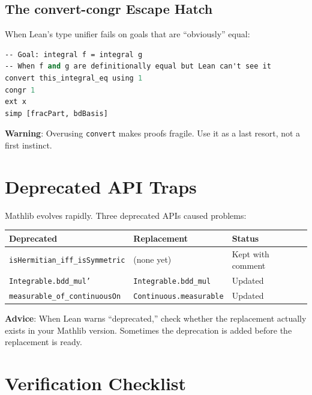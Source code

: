 \documentclass[11pt,a4paper]{article}
\newcommand{\lean}[1]{\texttt{#1}}
\begin{document}
\subsection{The convert-congr Escape Hatch}

When Lean's type unifier fails on goals that are ``obviously'' equal:

\begin{lstlisting}[language=ML,caption={Type unification escape}]
-- Goal: integral f = integral g
-- When f and g are definitionally equal but Lean can't see it
convert this_integral_eq using 1
congr 1
ext x
simp [fracPart, bdBasis]
\end{lstlisting}

\textbf{Warning}: Overusing \lean{convert} makes proofs fragile.
Use it as a last resort, not a first instinct.

\section{Deprecated API Traps}
\label{sec:deprecated}

Mathlib evolves rapidly. Three deprecated APIs caused problems:

\begin{center}
\begin{tabular}{@{}lll@{}}
\toprule
\textbf{Deprecated} & \textbf{Replacement} & \textbf{Status} \\
\midrule
\lean{isHermitian\_iff\_isSymmetric} & (none yet) & Kept with comment \\
\lean{Integrable.bdd\_mul'} & \lean{Integrable.bdd\_mul} & Updated \\
\lean{measurable\_of\_continuousOn} & \lean{Continuous.measurable} & Updated \\
\bottomrule
\end{tabular}
\end{center}

\textbf{Advice}: When Lean warns ``deprecated,'' check whether
the replacement actually exists in your Mathlib version. Sometimes
the deprecation is added before the replacement is ready.

\section{Verification Checklist}
\label{sec:checklist}
\end{document}
